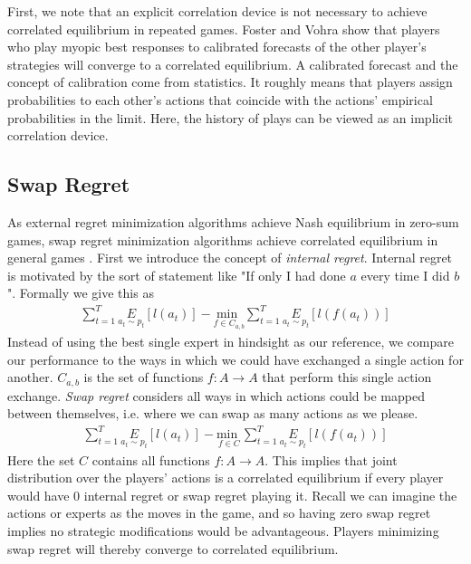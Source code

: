 \documentclass{article}
\begin{document}
First, we note that an explicit correlation device is not necessary to achieve correlated equilibrium in repeated games. Foster and Vohra \cite{foster1997calibrated} show that players who play myopic best responses to calibrated forecasts of the other player's strategies will converge to a correlated equilibrium. A calibrated forecast and the concept of calibration come from statistics. It roughly means that players assign probabilities to each other's actions that coincide with the actions' empirical probabilities in the limit. Here, the history of plays can be viewed as an implicit correlation device.

\subsection{Swap Regret}

As external regret minimization algorithms achieve Nash equilibrium in zero-sum games, swap regret minimization algorithms achieve correlated equilibrium in general games \cite{blum2007external}. First we introduce the concept of \emph{internal regret}. Internal regret is motivated by the sort of statement like "If only I had done $a$ every time I did $b$". Formally we give this as
\begin{align*}
\sum_{t=1}^T \underset{a_t \sim p_t}{E}[l(a_t)] - \underset{f \in C_{a,b}}{\text{min }} \sum_{t=1}^T \underset{a_t \sim p_t}{E}[l(f(a_t))]
\end{align*}
Instead of using the best single expert in hindsight as our reference, we compare our performance to the ways in which we could have exchanged a single action for another. $C_{a,b}$ is the set of functions $f: A \rightarrow A$ that perform this single action exchange. \emph{Swap regret} considers all ways in which actions could be mapped between themselves, i.e. where we can swap as many actions as we please.
\begin{align*}
\sum_{t=1}^T \underset{a_t \sim p_t}{E}[l(a_t)] - \underset{f \in C}{\text{min }} \sum_{t=1}^T \underset{a_t \sim p_t}{E}[l(f(a_t))]
\end{align*}
Here the set $C$ contains all functions $f: A \rightarrow A$. This implies that joint distribution over the players' actions is a correlated equilibrium if every player would have 0 internal regret or swap regret playing it. Recall we can imagine the actions or experts as the moves in the game, and so having zero swap regret implies no strategic modifications would be advantageous. Players minimizing swap regret will thereby converge to correlated equilibrium. 
\end{document}
